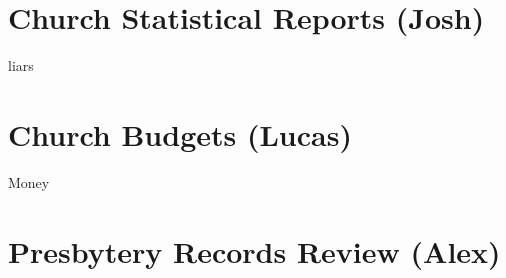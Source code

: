 \documentclass[
]{book}
\begin{document}
\hypertarget{church-statistical-reports-josh}{%
\chapter{Church Statistical Reports (Josh)}\label{church-statistical-reports-josh}}

liars

\hypertarget{church-budgets-lucas}{%
\chapter{Church Budgets (Lucas)}\label{church-budgets-lucas}}

Money

\hypertarget{presbytery-records-review-alex}{%
\chapter{Presbytery Records Review (Alex)}\label{presbytery-records-review-alex}}
\end{document}

